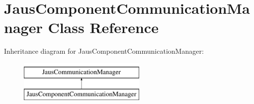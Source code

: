 \hypertarget{class_jaus_component_communication_manager}{\section{\-Jaus\-Component\-Communication\-Manager \-Class \-Reference}
\label{class_jaus_component_communication_manager}
}
\-Inheritance diagram for \-Jaus\-Component\-Communication\-Manager\-:\begin{figure}[H]
\begin{center}
\leavevmode
\includegraphics[height=2.000000cm]{class_jaus_component_communication_manager}
\end{center}
\end{figure}
